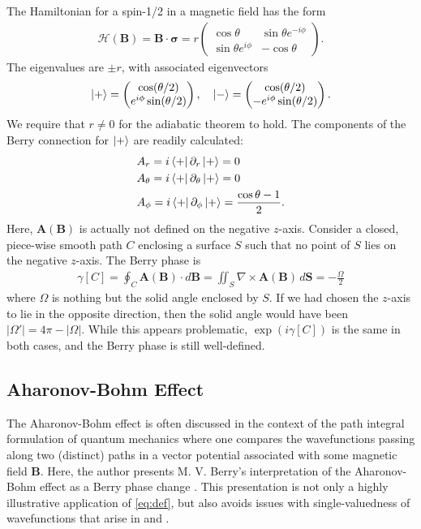 \documentclass[reprint,
nofootinbib,
amsmath,amssymb,
aps]{revtex4-1}
\newcommand{\p}{\partial}
\newcommand{\f}[2]{\frac{#1}{#2}}
\begin{document}
The Hamiltonian for a spin-1/2 in a magnetic field has the form
\begin{align*}
\mathcal{H}(\bm{B}) = \bm{B}\cdot \bm{\sigma} = r \begin{pmatrix}
\cos\theta & \sin\theta e^{-i\phi} \\ \sin\theta e^{i\phi} & -\cos\theta
\end{pmatrix}.
\end{align*}
The eigenvalues are $\pm r$, with associated eigenvectors
\begin{align*}
\ket{+} = \begin{pmatrix}
\cos(\theta/2) \\ e^{i\phi}\sin(\theta/2) 
\end{pmatrix}, \quad \ket{-} = \begin{pmatrix}
\cos(\theta/2) \\ - e^{i\phi}\sin(\theta/2) 
\end{pmatrix} .
\end{align*}
We require that $r  \neq 0$ for the adiabatic theorem to hold. The components of the Berry connection for $\ket{+}$ are readily calculated:
\begin{align*}
&A_r = i\bra{+}\p_r \ket{+} = 0\\
&A_\theta = i\bra{+}\p_\theta\ket{+} = 0\\
&A_\phi = i\bra{+}\p_\phi \ket{+} = \f{\cos\theta - 1}{2}. 
\end{align*}
Here, $\bm{A}(\bm{B})$ is actually not defined on the negative $z$-axis. Consider a closed, piece-wise smooth path $C$ enclosing a surface $S$ such that no point of $S$ lies on the negative $z$-axis. The Berry phase is 
\begin{align*}
\gamma[C] = \oint_C \bm{A}(\bm{B}) \cdot d\bm{B} = \iint_S \nabla \times \bm{A}(\bm{B})  \, d\bm{S} = -\f{\Omega}{2} 
\end{align*}
where $\Omega$ is nothing but the solid angle enclosed by $S$. If we had chosen the $z$-axis to lie in the opposite direction, then the solid angle would have been $|\Omega'| = 4\pi - |\Omega|$.  While this appears problematic,  $\exp(i\gamma[C])$ is the same in both cases, and the Berry phase is still well-defined. 




\subsection{Aharonov-Bohm Effect}


The Aharonov-Bohm effect is often discussed in the context of the path integral formulation of quantum mechanics where one compares the wavefunctions passing along two (distinct) paths in a vector potential associated with some magnetic field $\bm{B}$.  Here, the author presents M. V. Berry's interpretation of the Aharonov-Bohm effect as a Berry phase change \cite{berry1984quantal}. This presentation is not only a highly illustrative application of \eqref{eq:def}, but also avoids issues with single-valuedness of wavefunctions that arise in \cite{aharonov1959significance} and \cite{ehrenberg1949refractive}. 
\end{document}
